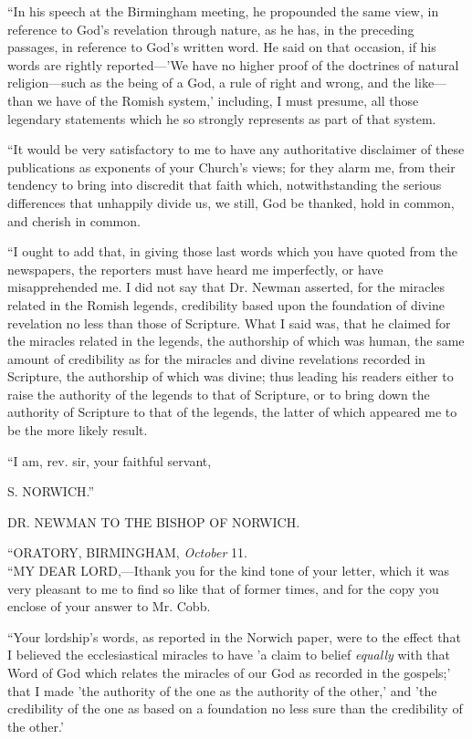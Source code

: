 ``In his speech at the Birmingham meeting, he
propounded the same view, in reference to God's
revelation through nature, as he has, in the preceding
passages, in reference to God's written word. He said on
that occasion, if his words are rightly reported—'We
have no higher proof of the doctrines of natural
religion—such as the being of a God, a rule of right
and wrong, and the like—than we have of the Romish
system,' including, I must presume, all those legendary
statements which he so strongly represents as part of
that system.


``It would be very satisfactory to me to have any
authoritative disclaimer of these publications as
exponents of your Church's views; for they alarm me, from
their tendency to bring into discredit that faith which,
notwithstanding the serious differences that unhappily
divide us, we still, God be thanked, hold in common, and
cherish in common.


``I ought to add that, in giving those last words
which you have quoted from the newspapers, the reporters
must have heard me imperfectly, or have misapprehended
me. I did not say that Dr. Newman asserted, for the
miracles related in the Romish legends, credibility based
upon the foundation of divine revelation no less than
those of Scripture. What I said was, that he claimed for
the miracles related in the legends, the authorship of
which was human, the same amount of credibility as for
the miracles and divine revelations recorded in
Scripture, the authorship of which was divine; thus
leading his readers either to raise the authority of the
legends to that of Scripture, or to bring down the
authority of Scripture to that of the legends, the latter
of which appeared me to be the more likely result.


``I am, rev. sir, your faithful servant,

S. NORWICH.''






DR. NEWMAN TO THE BISHOP OF NORWICH.

``ORATORY, BIRMINGHAM, \emph{October} 11. \emph{}\\
``MY DEAR
LORD,—I\emph{}thank you for the
kind tone of your letter, which it was very pleasant to
me to find so like that of former times, and for the copy
you enclose of your answer to Mr. Cobb.


``Your lordship's words, as reported in the
Norwich paper, were to the effect that I believed the
ecclesiastical miracles to have 'a claim to belief \emph{equally}
with that Word of God which relates the miracles of our
God as recorded in the gospels;' that I made 'the
authority of the one as the authority of the other,' and
'the credibility of the one as based on a foundation no
less sure than the credibility of the other.'


